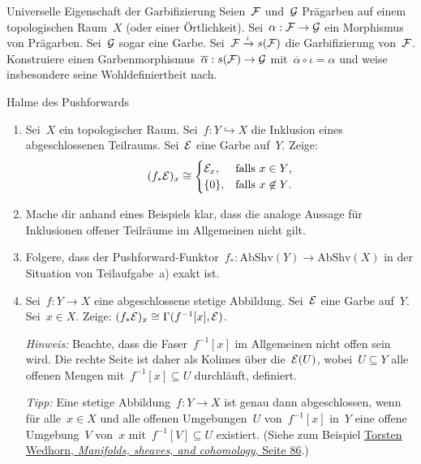 \documentclass{uebblatt}
\begin{document}

\begin{aufgabe}{Universelle Eigenschaft der Garbifizierung}
Seien~$\mathcal{F}$ und~$\mathcal{G}$ Prägarben auf einem topologischen Raum~$X$ (oder einer
Örtlichkeit). Sei~$\alpha : \mathcal{F} \to \mathcal{G}$ ein Morphismus von Prägarben. Sei~$\mathcal{G}$
sogar eine Garbe. Sei~$\mathcal{F} \xrightarrow{\iota} s(\mathcal{F})$ die Garbifizierung von~$\mathcal{F}$.
Konstruiere einen Garbenmorphismus~$\overline{\alpha} : s(\mathcal{F}) \to \mathcal{G}$
mit~$\overline{\alpha} \circ \iota = \alpha$ und weise insbesondere seine
Wohldefiniertheit nach.
\end{aufgabe}

\begin{aufgabe}{Halme des Pushforwards}
\begin{enumerate}
\item Sei~$X$ ein topologischer Raum. Sei~$f : Y \hookrightarrow X$ die
Inklusion eines abgeschlossenen Teilraums. Sei~$\mathcal{E}$ eine Garbe auf~$Y$. Zeige:
\[ (f_* \mathcal{E})_x \cong \begin{cases}
  \mathcal{E}_x, & \text{falls $x \in Y$,} \\
  \{0\}, & \text{falls $x \not\in Y$.}
\end{cases} \]
\item Mache dir anhand eines Beispiels klar, dass die analoge Aussage für
Inklusionen offener Teilräume im Allgemeinen nicht gilt.
\item Folgere, dass der Pushforward-Funktor~$f_* : \mathrm{AbShv}(Y) \to
\mathrm{AbShv}(X)$ in der Situation von Teilaufgabe~a) exakt ist.
\item Sei~$f : Y \to X$ eine abgeschlossene stetige Abbildung. Sei~$\mathcal{E}$ eine
Garbe auf~$Y$. Sei~$x \in X$. Zeige: $(f_* \mathcal{E})_x \cong \Gamma(f^{-1}[x], \mathcal{E})$.

\emph{Hinweis:} Beachte, dass die Faser~$f^{-1}[x]$ im Allgemeinen nicht offen
sein wird. Die rechte Seite ist daher als Kolimes über die~$\mathcal{E}(U)$, wobei~$U
\subseteq Y$ alle offenen Mengen mit~$f^{-1}[x] \subseteq U$ durchläuft,
definiert.

\emph{Tipp:} Eine stetige Abbildung~$f : Y \to X$ ist genau dann abgeschlossen,
wenn für alle~$x \in X$ und alle offenen Umgebungen~$U$ von~$f^{-1}[x]$ in~$Y$
eine offene Umgebung~$V$ von~$x$ mit~$f^{-1}[V] \subseteq U$ existiert.
(Siehe zum Beispiel
\href{https://www2.math.uni-paderborn.de/fileadmin/Mathematik/People/wedhorn/Lehre/SkriptMannigfaltigkeiten.pdf#page=86}{Torsten
Wedhorn, \emph{Manifolds, sheaves, and cohomology}, Seite 86}.)
\end{enumerate}
\end{aufgabe}
\end{document}
